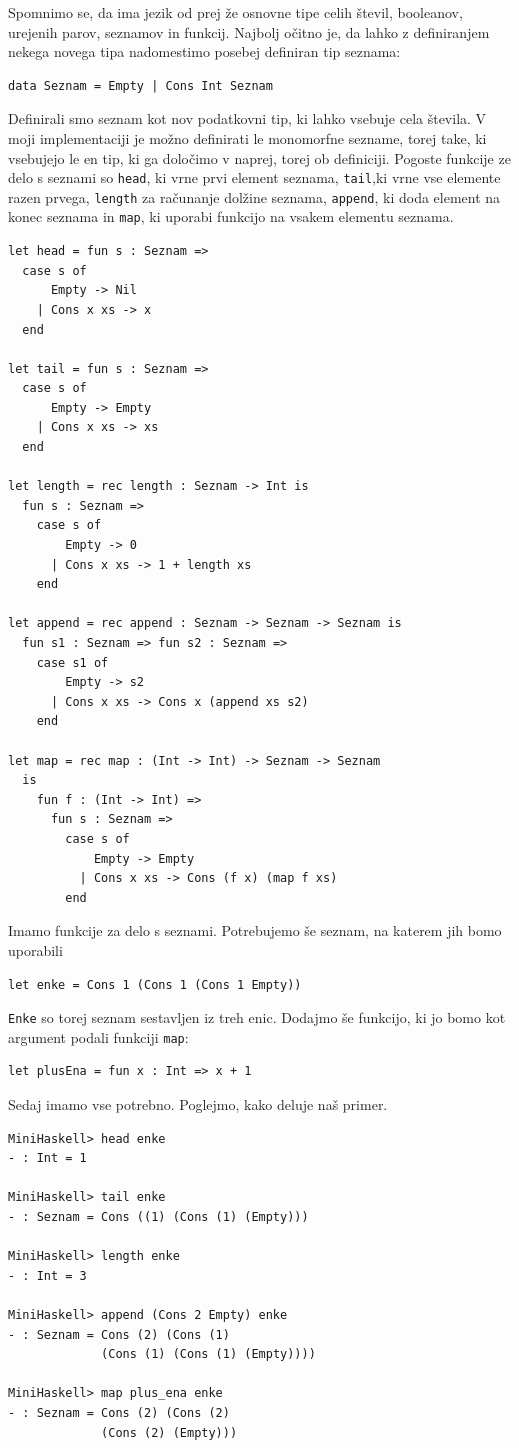 \documentclass[a4paper,12pt,openright]{book}
\begin{document}
Spomnimo se, da ima jezik od prej že osnovne tipe celih števil, booleanov, urejenih parov, seznamov in funkcij. Najbolj očitno je, da lahko z definiranjem nekega novega tipa nadomestimo posebej 
definiran tip seznama:
\begin{lstlisting}
data Seznam = Empty | Cons Int Seznam
\end{lstlisting}
Definirali smo seznam kot nov podatkovni tip, ki lahko vsebuje cela števila. V moji implementaciji je možno definirati le monomorfne sezname, torej take, ki vsebujejo le en tip, ki ga določimo v naprej, torej ob definiciji. 
Pogoste funkcije ze delo s seznami so \lstinline{head}, ki vrne prvi element seznama, \lstinline{tail},ki vrne vse elemente razen prvega, \lstinline{length} za računanje 
dolžine seznama, \lstinline{append}, ki doda element na konec seznama in \lstinline{map}, ki uporabi funkcijo na vsakem elementu seznama. 
\begin{lstlisting}
let head = fun s : Seznam => 
  case s of
      Empty -> Nil
    | Cons x xs -> x
  end

let tail = fun s : Seznam =>
  case s of
      Empty -> Empty
    | Cons x xs -> xs
  end

let length = rec length : Seznam -> Int is
  fun s : Seznam =>
    case s of
        Empty -> 0
      | Cons x xs -> 1 + length xs
    end

let append = rec append : Seznam -> Seznam -> Seznam is
  fun s1 : Seznam => fun s2 : Seznam => 
    case s1 of
        Empty -> s2
      | Cons x xs -> Cons x (append xs s2)
    end

let map = rec map : (Int -> Int) -> Seznam -> Seznam 
  is
    fun f : (Int -> Int) =>
      fun s : Seznam =>
        case s of
            Empty -> Empty
          | Cons x xs -> Cons (f x) (map f xs)
        end
\end{lstlisting}
Imamo funkcije za delo s seznami. Potrebujemo še seznam, na katerem jih bomo uporabili
\begin{lstlisting}
let enke = Cons 1 (Cons 1 (Cons 1 Empty))
\end{lstlisting}
\lstinline{Enke} so torej seznam sestavljen iz treh enic. Dodajmo še funkcijo, ki jo bomo kot argument podali funkciji \lstinline{map}:
\begin{lstlisting}
let plusEna = fun x : Int => x + 1
\end{lstlisting}
Sedaj imamo vse potrebno. Poglejmo, kako deluje naš primer.
\begin{lstlisting}
MiniHaskell> head enke
- : Int = 1

MiniHaskell> tail enke
- : Seznam = Cons ((1) (Cons (1) (Empty)))

MiniHaskell> length enke
- : Int = 3

MiniHaskell> append (Cons 2 Empty) enke
- : Seznam = Cons (2) (Cons (1) 
             (Cons (1) (Cons (1) (Empty))))

MiniHaskell> map plus_ena enke
- : Seznam = Cons (2) (Cons (2) 
             (Cons (2) (Empty)))
\end{lstlisting}
\end{document}
